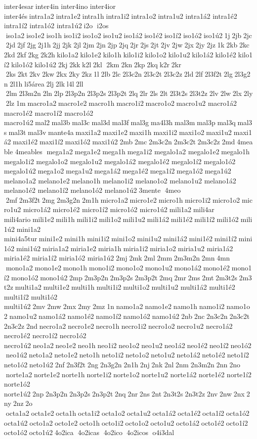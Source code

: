 inter4esar inter4in 	inter4ino 	inter4ior 	inter4és intra1a2 intra1e2 intra1h intra1i2 intra1o2 intra1u2 	intra1á2 	intra1é2 	intra1í2 	intra1ó2 	intra1ú2 i2o  i2os  iso1a2 iso1e2 iso1h iso1i2 iso1o2 iso1u2 iso1á2 iso1é2 iso1í2 iso1ó2 iso1ú2 1j 2jb 2jc 2jd 2jf 2jg 2j1h 2jj 2jk 2jl 2jm 2jn 2jp 2jq 2jr 2js 2jt 2jv 2jw 2jx 2jy 2jz 1k 2kb 2kc 2kd 2kf 2kg 2k2h kilo1a2 kilo1e2 kilo1h kilo1i2 kilo1o2 kilo1u2 kilo1á2 kilo1é2 kilo1í2 kilo1ó2 kilo1ú2 2kj 2kk k2l 2kl  2km 2kn 2kp 2kq k2r 2kr  2ks 2kt 2kv 2kw 2kx 2ky 2kz 1l 2lb 2lc 2l3c2n 2l3c2t 2l3c2z 2ld 2lf 2l3f2t 2lg 2l3g2n 2l1h li5área 2lj 2lk l4l 2ll  2lm 2l3m2n 2ln 2lp 2l3p2n 2l3p2s 2l3p2t 2lq 2lr 2ls 2lt 2l3t2s 2l3t2z 2lv 2lw 2lx 2ly 2lz 1m macro1a2 macro1e2 macro1h macro1i2 macro1o2 macro1u2 	macro1á2 	macro1é2 	macro1í2 	macro1ó2 	macro1ú2 mal2 mal3b mal3c mal3d mal3f mal3g ma4l3h mal3m mal3p mal3q mal3s mal3t mal3v mante4a maxi1a2 maxi1e2 maxi1h maxi1i2 maxi1o2 maxi1u2 maxi1á2 maxi1é2 maxi1í2 maxi1ó2 maxi1ú2 2mb 2mc 2m3c2n 2m3c2t 2m3c2z 2md 4meable  	4meables  mega1a2 mega1e2 mega1h mega1i2 	megalo1a2 	megalo1e2 megalo1h 	megalo1i2 	megalo1o2 	megalo1u2 
megalo1á2 
megalo1é2 
megalo1í2 
megalo1ó2 
megalo1ú2 mega1o2 mega1u2 mega1á2 mega1é2 mega1í2 mega1ó2 mega1ú2 	melano1a2 	melano1e2 melano1h 	melano1i2 	melano1o2 	melano1u2 
melano1á2 
melano1é2 
melano1í2 
melano1ó2 
melano1ú2 3mente  4meo  2mf 2m3f2t 2mg 2m3g2n 2m1h micro1a2 micro1e2 micro1h micro1i2 micro1o2 micro1u2 	micro1á2 	micro1é2 	micro1í2 	micro1ó2 	micro1ú2 mili1a2 mili4ar 	mili4ario mili1e2 mili1h mili1i2 mili1o2 mili1u2 mili1á2 mili1é2 mili1í2 mili1ó2 mili1ú2 mini1a2 
mini4a5tur mini1e2 mini1h mini1i2 mini1o2 mini1u2 mini1á2 mini1é2 mini1í2 mini1ó2 mini1ú2 miria1a2 miria1e2 miria1h miria1i2 miria1o2 miria1u2 	miria1á2 	miria1é2 	miria1í2 	miria1ó2 	miria1ú2 2mj 2mk 2ml 2mm 2m3m2n 2mn 4mn  mono1a2 mono1e2 mono1h mono1i2 mono1o2 mono1u2 mono1á2 mono1é2 mono1í2 mono1ó2 mono1ú2 2mp 2m3p2n 2m3p2s 2m3p2t 2mq 2mr 2ms 2mt 2m3t2s 2m3t2z multi1a2 multi1e2 multi1h multi1i2 multi1o2 multi1u2 	multi1á2 	multi1é2 	multi1í2 	multi1ó2 	multi1ú2 2mv 2mw 2mx 2my 2mz 1n namo1a2 namo1e2 namo1h namo1i2 namo1o2 namo1u2 namo1á2 namo1é2 namo1í2 namo1ó2 namo1ú2 2nb 2nc 2n3c2n 2n3c2t 2n3c2z 2nd necro1a2 necro1e2 necro1h necro1i2 necro1o2 necro1u2 	necro1á2 	necro1é2 	necro1í2 	necro1ó2 	necro1ú2 neo1a2 neo1e2 neo1h neo1i2 neo1o2 neo1u2 neo1á2 neo1é2 neo1í2 neo1ó2 neo1ú2 neto1a2 neto1e2 neto1h neto1i2 neto1o2 neto1u2 neto1á2 neto1é2 neto1í2 neto1ó2 neto1ú2 2nf 2n3f2t 2ng 2n3g2n 2n1h 2nj 2nk 2nl 2nm 2n3m2n 2nn 2no  norte1a2 norte1e2 norte1h norte1i2 norte1o2 norte1u2 	norte1á2 	norte1é2 	norte1í2 	norte1ó2 	norte1ú2 2np 2n3p2n 2n3p2s 2n3p2t 2nq 2nr 2ns 2nt 2n3t2s 2n3t2z 2nv 2nw 2nx 2ny 2nz 2o  octa1a2 octa1e2 octa1h octa1i2 octa1o2 octa1u2 octa1á2 octa1é2 octa1í2 octa1ó2 octa1ú2 octo1a2 octo1e2 octo1h octo1i2 octo1o2 octo1u2 octo1á2 octo1é2 octo1í2 octo1ó2 octo1ú2 4o2ica  4o2icas  4o2ico  4o2icos  o4i3dal  
